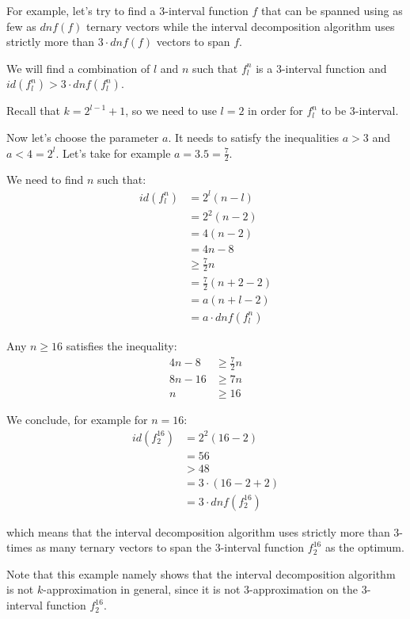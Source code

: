 \begin{example}
\label{example:3inthard}
For example,
let's try to find a $3$-interval function $f$
that can be spanned using
as few as
$\mathit{dnf}(f)$ ternary vectors
while the interval decomposition algorithm uses
strictly more than $3 \cdot \mathit{dnf}(f)$ vectors
to span $f$.

We will find a combination of $l$ and $n$
such that $f_l^n$ is a $3$-interval function
and
$id(f_l^n) > 3 \cdot \mathit{dnf}(f_l^n)$.

Recall that $k = 2^{l-1}+1$,
so we need to use $l = 2$
in order for $f_l^n$ to be $3$-interval.

Now let's choose the parameter $a$.
It needs to satisfy the inequalities $a > 3$
and $a < 4 = 2^l$.
Let's take for example $a = 3.5 = \frac{7}{2}$.

We need to find $n$ such that:
\begin{align*}
id(f_l^n) &= 2^l(n-l) \\
&= 2^2(n-2) \\
&= 4 (n-2) \\
&= 4n - 8 \\
&\geq \frac{7}{2} n \\
&= \frac{7}{2} (n+2-2) \\
&= a (n+l-2) \\
&= a \cdot \mathit{dnf}(f_l^n)
\end{align*}

Any $n \geq 16$ satisfies the inequality:
\begin{align*}
4n - 8 &\geq \frac{7}{2} n \\
8n - 16 &\geq 7n \\
n &\geq 16
\end{align*}

We conclude, for example for $n = 16$:
\begin{align*}
id(f_2^{16})
&= 2^2 (16 - 2) \\
&= 56 \\
&> 48 \\
&= 3 \cdot (16 - 2 + 2) \\
&= 3 \cdot \mathit{dnf}(f_2^{16})
\end{align*}

which means that the interval decomposition algorithm
uses strictly more
than $3$-times as many ternary vectors to span
the $3$-interval function
$f_2^{16}$ as the optimum.

Note that this example namely shows
that the interval decomposition algorithm
is not $k$-approximation in general,
since it is not $3$-approximation
on the $3$-interval function $f_2^{16}$.
\end{example}

